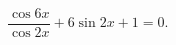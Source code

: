\begin{ex}[type=equation]
	\begin{condition}
		$\ \dfrac{\cos 6x}{\cos 2x}+6\sin 2x +1  = 0. $
	\end{condition}
\end{ex}